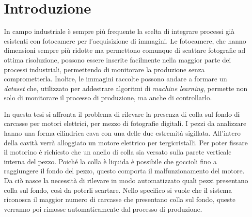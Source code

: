 
\chapter{Introduzione}

In campo industriale è sempre più frequente la scelta di integrare processi già esistenti con fotocamere per l'acquisizione di immagini.
Le fotocamere, che hanno dimensioni sempre più ridotte ma permettono comunque di scattare fotografie ad ottima risoluzione, possono essere inserite facilmente nella maggior parte dei processi industriali, permettendo di monitorare la produzione senza comprometterla.
Inoltre, le immagini raccolte possono andare a formare un \textit{dataset} che, utilizzato per addestrare algoritmi di \textit{machine learning}, permette non solo di monitorare il processo di produzione, ma anche di controllarlo.

In questa tesi si affronta il problema di rilevare la presenza di colla sul fondo di carcasse per motori elettrici, per mezzo di fotografie digitali.
I pezzi da analizzare hanno una forma cilindrica cava con una delle due estremità sigillata.
All'intero della cavità verrà alloggiato un motore elettrico per tergicristalli.
Per poter fissare il motorino è richiesto che un anello di colla sia versato sulla parete verticale interna del pezzo.
Poiché la colla è liquida è possibile che goccioli fino a raggiungere il fondo del pezzo, questo comporta il malfunzionamento del motore.
Da ciò nasce la necessità di rilevare in modo automatizzato quali pezzi presentano colla sul fondo, così da poterli scartare.
Nello specifico si vuole che il sistema riconosca il maggior numero di carcasse che presentano colla sul fondo, queste verranno poi rimosse automaticamente dal processo di produzione.

